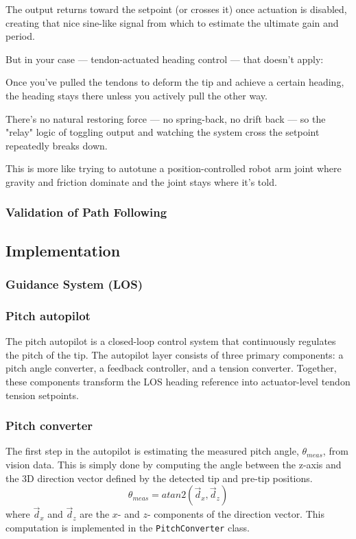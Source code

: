 The output returns toward the setpoint (or crosses it) once actuation is disabled, creating that nice sine-like signal from which to estimate the ultimate gain and period.

But in your case — tendon-actuated heading control — that doesn’t apply:

Once you've pulled the tendons to deform the tip and achieve a certain heading, the heading stays there unless you actively pull the other way.

There’s no natural restoring force — no spring-back, no drift back — so the "relay" logic of toggling output and watching the system cross the setpoint repeatedly breaks down.

This is more like trying to autotune a position-controlled robot arm joint where gravity and friction dominate and the joint stays where it's told.

\subsubsection{Validation of Path Following}


\subsection{Implementation}

\subsubsection{Guidance System (LOS)}


\subsubsection{Pitch autopilot}
The pitch autopilot is a closed-loop control system that continuously regulates the pitch of the tip. The autopilot layer consists of three primary components: a pitch angle converter, a feedback controller, and a tension converter. Together, these components transform the LOS heading reference into actuator-level tendon tension setpoints.

\subsubsection{Pitch converter}
The first step in the autopilot is estimating the measured pitch angle, \(\theta_{meas}\), from vision data. This is simply done by computing the angle between the z-axis and the 3D direction vector defined by the detected tip and pre-tip positions. 
\begin{equation}
    \theta_{meas} = atan2(\vec{d}_x,\vec{d}_z)
\end{equation}
where \(\vec{d}_x\) and \(\vec{d}_z\) are the \(x\)- and \(z\)- components of the direction vector. This computation is implemented in the \texttt{PitchConverter} class.

